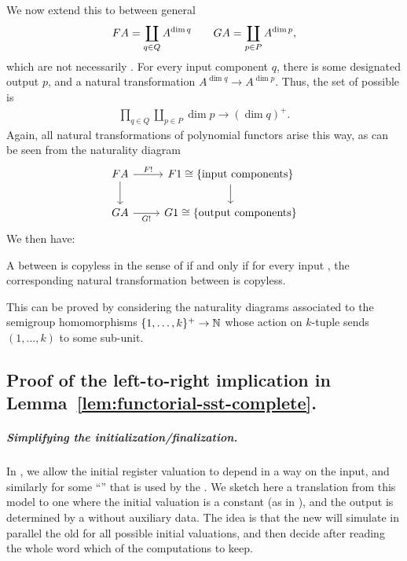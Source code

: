 We now extend this  to  between general 
\begin{align*}
\functor A = \coprod_{q \in Q} A^{\dim q} \qquad 
\functorg A = \coprod_{p \in P} A^{\dim p},
\end{align*}
which are not necessarily . For every input component $q$, there is some designated output  $p$, and a natural transformation $A^{\dim q} \to A^{\dim p}$. Thus, the set of possible  is
\begin{align*}
\prod_{q \in Q} \coprod_{p \in P} \dim p \to (\dim q)^+.
\end{align*}
Again, all natural transformations of polynomial functors arise this way, as can
be seen from the naturality diagram
\[
  \begin{tikzcd}
    \functor A 
    \ar[r,"\functor !"]
    \ar[d]
    &
    \functor 1 \cong \{\text{input components}\}
    \ar[d]
    \\
    \functorg A
    \ar[r,"\functorg !"']
    &
    \functorg 1 \cong \{\text{output components}\}
  \end{tikzcd}
\]
We then have:
\begin{claim}
  A  between  is copyless in the sense of  if and only if for every input , the corresponding natural transformation between  is copyless.
\end{claim}
This can be proved by considering the naturality diagrams associated to the
semigroup homomorphisms $\{1,\dots,k\}^+ \to {\mathbb N}$ whose action on $k$-tuple
sends $(1,\dots,k)$ to some sub-unit.


\subsection{Proof of the left-to-right implication in Lemma~\ref{lem:functorial-sst-complete}.}

\subparagraph{Simplifying the initialization/finalization.}

In , we allow the initial register valuation to depend in a  way on the input, and similarly for some \enquote{} that is used by the . We sketch here a translation from this model to one where the initial valuation is a constant (as in ), and the output is determined by a  without auxiliary data. The idea is that the new \functorialsst will simulate in parallel the old \functorialsst for all possible initial valuations, and then decide after reading the whole word which of the computations to keep.


